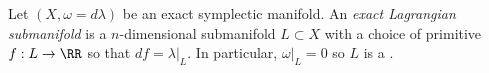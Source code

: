 

    Let $(X,  \omega=d\lambda)$ be an exact symplectic manifold.
    An \emph{exact Lagrangian submanifold} is a $n$-dimensional submanifold $L\subset X$ with a choice of primitive $f: L\to \RR$ so that $df=\lambda|_L$. In particular, $\omega|_L=0$ so $L$ is a .

